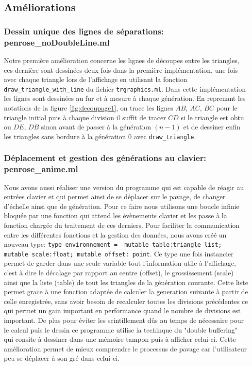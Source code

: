 \documentclass[a4paper,13pt]{article}
\begin{document}
\subsection{Améliorations}

\subsubsection{Dessin unique des lignes de séparations: penrose\_noDoubleLine.ml}
Notre première amélioration concerne les lignes de découpes entre les triangles, ces dernière sont dessinées deux fois dans la première implémentation, une fois avec chaque triangle lors de l'affichage en utilisant la fonction \texttt{draw_triangle_with_line} du fichier \texttt{trgraphics.ml}. Dans cette implémentation les lignes sont dessinées au fur et à mesure à chaque génération. En reprenant les notations de la figure \ref{fig:decoupage1}, on trace les lignes $AB$, $AC$, $BC$ pour le triangle initial puis à chaque division il suffit de tracer $CD$ si le triangle est obtu ou $DE$, $DB$ sinon avant de passer à la génération $(n-1)$ et de dessiner enfin les triangles sans bordure à la génération $0$ avec \texttt{draw_triangle}.

\subsubsection{Déplacement et gestion des générations au clavier: penrose\_anime.ml}

Nous avons aussi réaliser une version du programme qui est capable de réagir au entrées clavier et qui permet ainsi de se déplacer sur le pavage, de changer d'échelle ainsi que de génération. Pour ce faire nous utilisons une boucle infinie bloquée par une fonction qui attend les évènements clavier et les passe à la fonction chargée du traitement de ces derniers. Pour faciliter la communication entre les différentes fonctions et la gestion des données, nous avons créé un nouveau type: \texttt{type environnement = { mutable table:triangle list; mutable scale:float; mutable offset: point}}. Ce type une fois instancier permet de garder dans une seule variable tout l'information utile à l'affichage, c'est à dire le décalage par rapport au centre (offset), le grossissement (scale) ainsi que la liste (table) de tout les triangles de la génération courante. Cette liste permet grace à une fonction adaptée de calculer la generation suivante à partir de celle enregistrée, sans avoir besoin de recalculer toutes les divisions précédentes ce qui permet un gain important en performance quand le nombre de divisions est important. De plus pour éviter les scintillement dûs au temps de nécessaire pour le calcul puis le dessin ce programme utilise la techinque du "double buffering" qui consite à dessiner dans une mémoire tampon puis à afficher celui-ci. Cette amélioration permet de mieux comprendre le processus de pavage car l'utilisateur peu se déplacer à son gré dans celui-ci.
\end{document}
